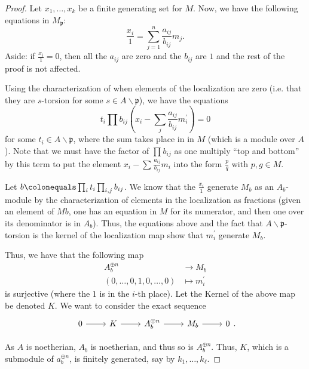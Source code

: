 \begin{proof}
	Let \(x_{1}, \ldots, x_{k}\) be a finite generating set
	for \(M\).
	Now, we have the following equations in \(M_{\mathfrak{p}}\):
	\[
		\frac{x_{i}}{1} = \sum_{j=1}^{n} \frac{a_{ij}}{b_{ij}} m_{j} 
	.\] 
	Aside: if \(\frac{x_{i}}{1} = 0\), then all the \(a_{ij}\) are zero
	and the \(b_{ij}\) are \(1\) and the rest of the proof is
	not affected.

	Using the characterization of when elements of the localization 
	are zero (i.e. that they are \(s\)-torsion for some 
	\(s \in A \smallsetminus \mathfrak{p} \)),
	we have the equations
	\[
	t_{i}\prod_{}^{} b_{ij}
	\left(x_{i} - \sum_{j}^{} \frac{a_{ij}}{b_{ij}} m^{\prime}_{i}  \right)
	= 0
	\] 
	for some \(t_{i} \in A \smallsetminus \mathfrak{p}\),
	where the sum takes place in
	in \(M\) (which is a module over \(A\)).
	Note that we must have the factor of \(\prod_{}^{} b_{ij} \) as
	one multiply ``top and bottom'' by this term
	to put the element \(x_{i} - \sum_{}^{} \frac{a_{ij}}{b_{ij}}m_{i} \) 
	into the form \(\frac{p}{q}\) with \(p,g \in M\).

	Let \(b \colonequals \prod_{i}^{} t_{i}  \prod_{i,j}^{} b_{ij}\). 
	We know that the \(\frac{x_{i}}{1}\) generate \(M_{b}\) as an
	\(A_{b}\)-module by the characterization of elements in the localization
	as fractions (given an element of \(M {b}\), one has an equation
	in \(M\) for its numerator, and then one over its denominator 
	is in \(A_{b}\)).
	Thus, the equations above and the fact that 
	\(A \smallsetminus \mathfrak{p}\)-torsion is the 
	kernel of the localization map show that
	\(m_{i}^{\prime}\) generate \(M_{b}\). 

	Thus, we have that the following map
	\begin{align*}
		A_{b}^{\oplus n} &\longrightarrow M_{b} \\
		(0,\ldots,0,1,0,\ldots,0) &\longmapsto m_{i}^{\prime}
	\end{align*}
	is surjective (where the \(1\) is in the \(i\)-th place).
	Let the Kernel of the above map be denoted \(K\).
	We want to consider the exact sequence
	\[
	\begin{tikzcd}
	0 \arrow{r}{} & K \arrow{r}{} & 
	A_{b}^{\oplus n} \arrow{r}{} & M_{b} \arrow{r}{} & 0
	\end{tikzcd}
	.\]
	
	As \(A\) is noetherian, \(A_{b}\) is noetherian,
	and thus so is \(A_{b}^{\oplus n}\).
	Thus, \(K\), which is a submodule of \(a_{b}^{\oplus n}\),
	is finitely generated, say by 
	\(k_{1}, \ldots, k_{\ell}\).
	

\end{proof}
